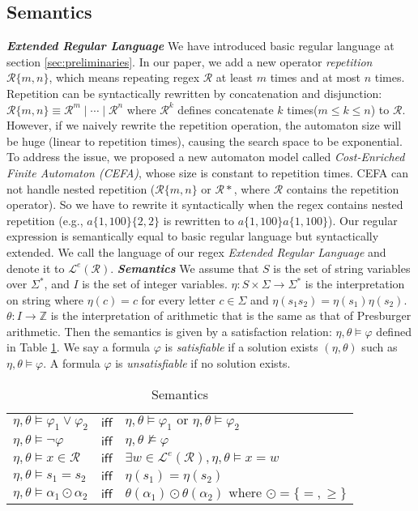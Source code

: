 \documentclass[sigconf]{acmart}
\newcommand*{\regex}{\mathcal{R}}
\newcommand*{\lan}{\mathcal{L}}
\newcommand*{\highlight}[1]{\textbf{\textit{#1}}}
\begin{document}
\subsection{Semantics}
\highlight{Extended Regular Language} We have introduced basic regular language at
section \ref{sec:preliminaries}. In our paper, we add a new operator \emph{repetition} $\regex\{m,n\}$, which means repeating regex $\regex$ at least $m$ times and at most $n$ times. Repetition can be syntactically rewritten by concatenation and disjunction:
$\regex\{m,n\} \equiv \regex^m\mid\cdots\mid\regex^n$ where $\regex^k$ defines concatenate $k$ times($m\leq k\leq n$) to $\regex$. However, if we naively rewrite the repetition operation, the automaton size will be huge (linear to repetition times), causing the search space to be exponential. To address the issue, we proposed a new automaton model called \emph{Cost-Enriched Finite Automaton (CEFA)}, whose size is constant to repetition times. CEFA can not handle nested repetition ($\regex\{m,n\}$ or $\regex *$, where $\regex$ contains the repetition operator). So we have to rewrite it syntactically when the regex contains nested repetition (e.g., $a\{1,100\}\{2,2\}$ is rewritten to $a\{1,100\}a\{1,100\}$). Our regular expression is semantically equal to basic regular language but syntactically extended. We call the language of our regex \emph{Extended Regular Language} and denote it to $\lan^e(\regex)$.\newline
\highlight{Semantics} We assume that $S$ is the set of string variables over $\Sigma^*$, and $I$ is the set of integer variables. $\eta: S\times\Sigma\rightarrow\Sigma^*$ is the interpretation on string where $\eta(c)=c$ for every letter $c\in \Sigma$ and $\eta(s_1s_2)=\eta(s_1)\eta(s_2)$. $\theta: I\rightarrow\mathbb{Z}$ is the interpretation of arithmetic that is the same as that of Presburger arithmetic. Then the semantics is given by a satisfaction relation: $\eta, \theta\models \varphi$ defined in Table \ref{tab:semantics}. We say a formula $\varphi$ is \emph{satisfiable} if a solution exists $(\eta, \theta)$ such as $\eta, \theta\models \varphi$. A formula $\varphi$ is \emph{unsatisfiable} if no solution exists.

\begin{table}[h]
  \begin{tabular}{lcl}
     $\eta,\theta \models \varphi_1\vee \varphi_2$ & $\mathsf{iff}$ & $\eta,\theta \models \varphi_1 \text{ or } \eta,\theta \models \varphi_2$\\
     $\eta,\theta \models \neg\varphi $          & $\mathsf{iff}$ & $\eta,\theta \not\models \varphi$\\
     $\eta, \theta \models x\in \regex$            & $\mathsf{iff}$ & $\exists w \in \lan^e(\regex),\eta,\theta \models x = w$\\
     $\eta, \theta \models s_1 = s_2$              & $\mathsf{iff}$ & $\eta(s_1) = \eta(s_2)$\\
     $\eta, \theta \models \alpha_1\odot\alpha_2$  & $\mathsf{iff}$ & $\theta(\alpha_1) \odot \theta(\alpha_2) \text{ where } \odot = \{=, \geq \}$
  \end{tabular}
  \caption{Semantics}
  \label{tab:semantics}
\end{table}
\end{document}
